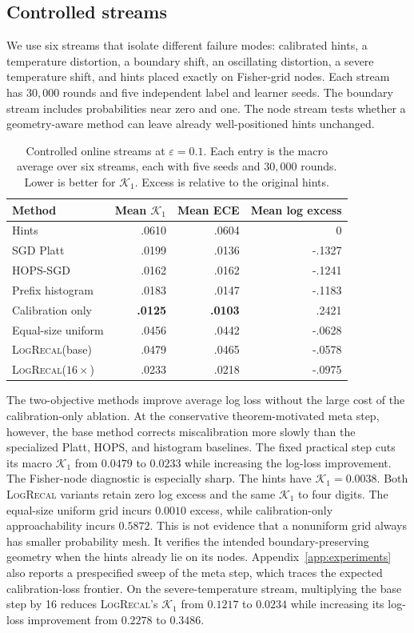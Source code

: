 \documentclass{article}
\newcommand{\method}{\textsc{LogRecal}\xspace}
\newcommand{\calK}{\mathcal{K}}
\begin{document}
\subsection{Controlled streams}

We use six streams that isolate different failure modes: calibrated hints, a temperature distortion, a boundary shift, an oscillating distortion, a severe temperature shift, and hints placed exactly on Fisher-grid nodes. Each stream has $30{,}000$ rounds and five independent label and learner seeds. The boundary stream includes probabilities near zero and one. The node stream tests whether a geometry-aware method can leave already well-positioned hints unchanged.

\begin{table}[t]
\centering
\caption{Controlled online streams at $\varepsilon=0.1$. Each entry is the
macro average over six streams, each with five seeds and $30{,}000$ rounds. Lower is better for $\calK_1$. Excess is relative to the original hints.}
\label{tab:synthetic}
\small
\begin{tabular}{lrrr}
\toprule
Method & Mean $\calK_1$ & Mean ECE & Mean log excess\\
\midrule
Hints & .0610 & .0604 & $0$\\
SGD Platt & .0199 & .0136 & -.1327\\
HOPS-SGD & .0162 & .0162 & -.1241\\
Prefix histogram & .0183 & .0147 & -.1183\\
Calibration only & \textbf{.0125} & \textbf{.0103} & .2421\\
Equal-size uniform & .0456 & .0442 & -.0628\\
\method (base) & .0479 & .0465 & -.0578\\
\method ($16\times$) & .0233 & .0218 & -.0975\\
\bottomrule
\end{tabular}
\end{table}

The two-objective methods improve average log loss without the large cost of the calibration-only ablation. At the conservative theorem-motivated meta step, however, the base method corrects miscalibration more slowly than the specialized Platt, HOPS, and histogram baselines. The fixed practical step cuts its macro $\calK_1$ from $0.0479$ to $0.0233$ while increasing the log-loss improvement. The Fisher-node diagnostic is especially sharp. The hints have $\calK_1=0.0038$. Both \method variants retain zero log excess and the same $\calK_1$ to four digits. The equal-size uniform grid incurs $0.0010$ excess, while calibration-only approachability incurs $0.5872$. This is not evidence that a nonuniform grid always has smaller probability mesh. It verifies the intended boundary-preserving geometry when the hints already lie on its nodes. Appendix~\ref{app:experiments} also reports a prespecified sweep of the meta step, which traces the expected calibration-loss frontier. On the severe-temperature stream, multiplying the base step by 16 reduces \method's $\calK_1$ from $0.1217$ to $0.0234$ while increasing its log-loss improvement from $0.2278$ to $0.3486$.
\end{document}
